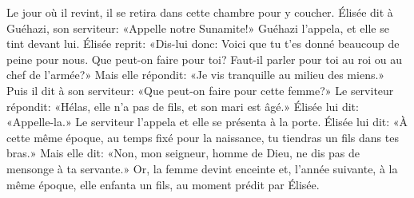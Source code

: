 Le jour où il revint, il se retira dans cette chambre pour y coucher.
Élisée dit à Guéhazi, son serviteur:
	«Appelle notre Sunamite!»
	Guéhazi l’appela, et elle se tint devant lui.
Élisée reprit: «Dis-lui donc:
	Voici que tu t’es donné beaucoup de peine pour nous.
Que peut-on faire pour toi?
Faut-il parler pour toi au roi ou au chef de l’armée?»
Mais elle répondit: «Je vis tranquille au milieu des miens.»
Puis il dit à son serviteur:
		«Que peut-on faire pour cette femme?»
Le serviteur répondit: «Hélas, elle n’a pas de fils, et son mari est âgé.»
Élisée lui dit: «Appelle-la.»
	Le serviteur l’appela et elle se présenta à la porte.
Élisée lui dit: «À cette même époque, au temps fixé pour la naissance,
	tu tiendras un fils dans tes bras.»
Mais elle dit: «Non, mon seigneur, homme de Dieu,
	ne dis pas de mensonge à ta servante.»
Or, la femme devint enceinte et, l’année suivante, à la même époque,
	elle enfanta un fils, au moment prédit par Élisée.
